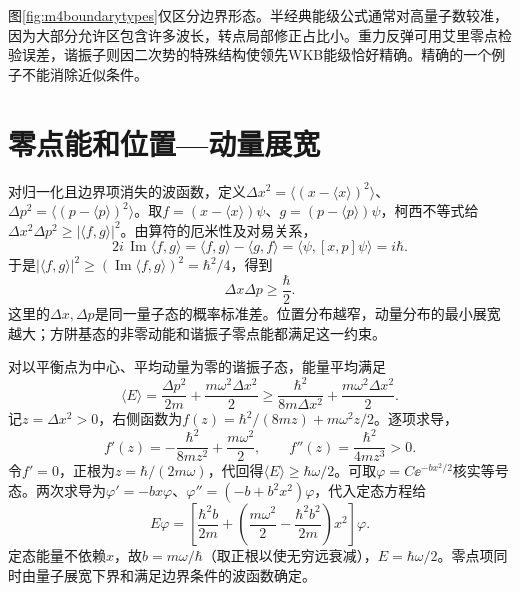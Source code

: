 图\ref{fig:m4boundarytypes}仅区分边界形态。半经典能级公式通常对高量子数较准，因为大部分允许区包含许多波长，转点局部修正占比小。重力反弹可用艾里零点检验误差，谐振子则因二次势的特殊结构使领先WKB能级恰好精确。精确的一个例子不能消除近似条件。

\section{零点能和位置—动量展宽}
对归一化且边界项消失的波函数，定义$\Delta x^2=\langle(x-\langle x\rangle)^2\rangle$、$\Delta p^2=\langle(p-\langle p\rangle)^2\rangle$。取$f=(x-\langle x\rangle)\psi$、$g=(p-\langle p\rangle)\psi$，柯西不等式给$\Delta x^2\Delta p^2\geq|\langle f,g\rangle|^2$。由算符的厄米性及对易关系，
\[
 2i\,\operatorname{Im}\langle f,g\rangle
 =\langle f,g\rangle-\langle g,f\rangle
 =\langle\psi,[x,p]\psi\rangle=i\hbar.
\]
于是$|\langle f,g\rangle|^2\geq(\operatorname{Im}\langle f,g\rangle)^2=\hbar^2/4$，得到
\[
 \Delta x\Delta p\geq\frac\hbar2.
\]
这里的$\Delta x,\Delta p$是同一量子态的概率标准差。位置分布越窄，动量分布的最小展宽越大；方阱基态的非零动能和谐振子零点能都满足这一约束。

对以平衡点为中心、平均动量为零的谐振子态，能量平均满足
\[
 \langle E\rangle=\frac{\Delta p^2}{2m}+\frac{m\omega^2\Delta x^2}2
 \geq\frac{\hbar^2}{8m\Delta x^2}+\frac{m\omega^2\Delta x^2}2.
\]
记$z=\Delta x^2>0$，右侧函数为$f(z)=\hbar^2/(8mz)+m\omega^2z/2$。逐项求导，
\[
 f'(z)=-\frac{\hbar^2}{8mz^2}+\frac{m\omega^2}{2},\qquad
 f''(z)=\frac{\hbar^2}{4mz^3}>0.
\]
令$f'=0$，正根为$z=\hbar/(2m\omega)$，代回得$\langle E\rangle\geq\hbar\omega/2$。可取$\varphi=C\ee^{-b x^2/2}$核实等号态。两次求导为$\varphi'=-bx\varphi$、$\varphi''=(-b+b^2x^2)\varphi$，代入定态方程给
\[
 E\varphi=\left[\frac{\hbar^2b}{2m}
 +\left(\frac{m\omega^2}{2}-\frac{\hbar^2b^2}{2m}\right)x^2\right]\varphi.
\]
定态能量不依赖$x$，故$b=m\omega/\hbar$（取正根以使无穷远衰减），$E=\hbar\omega/2$。零点项同时由量子展宽下界和满足边界条件的波函数确定。

